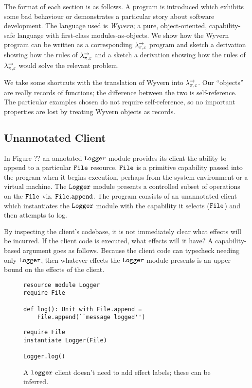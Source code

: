 The format of each section is as follows. A program is introduced which exhibits some bad behaviour or demonstrates a particular story about software development. The language used is \textit{Wyvern}; a pure, object-oriented, capability-safe language with first-class modules-as-objects. We show how the Wyvern program can be written as a corresponding $\lambda^{\rightarrow}_{\pi, \varepsilon}$ program and sketch a derivation showing how the rules of $\lambda^{\rightarrow}_{\pi, \varepsilon}$ and a sketch a derivation showing how the rules of $\lambda^{\rightarrow}_{\pi, \varepsilon}$ would solve the relevant problem.

We take some shortcuts with the translation of Wyvern into $\lambda^{\rightarrow}_{\pi, \varepsilon}$. Our ``objects'' are really records of functions; the difference between the two is self-reference. The particular examples chosen do not require self-reference, so no important properties are lost by treating Wyvern objects as records.

\subsection{Unannotated Client}

In Figure ?? an annotated $\mathtt{Logger}$ module provides its client the ability to append to a particular $\mathtt{File}$ resource. $\mathtt{File}$ is a primitive capability passed into the program when it begins execution, perhaps from the system environment or a virtual machine. The $\mathtt{Logger}$ module presents a controlled subset of operations on the $\mathtt{File}$ viz. $\mathtt{File.append}$. The program consists of an unannotated client which instantiates the $\mathtt{Logger}$ module with the capability it selects ($\mathtt{File}$) and then attempts to log.

By inspecting the client's codebase, it is not immediately clear what effects will be incurred. If the client code is executed, what effects will it have? A capability-based argument goes as follows. Because the client code can typecheck needing only $\mathtt{Logger}$, then whatever effects the $\mathtt{Logger}$ module presents is an upper-bound on the effects of the client.

\begin{figure}[h]

\begin{lstlisting}
resource module Logger
require File

def log(): Unit with File.append =
    File.append(``message logged'')
\end{lstlisting}

\begin{lstlisting}
require File
instantiate Logger(File)

Logger.log()
\end{lstlisting}

\caption{A $\mathtt{logger}$ client doesn't need to add effect labels; these can be inferred.}
\label{This is the label.}
\end{figure}

